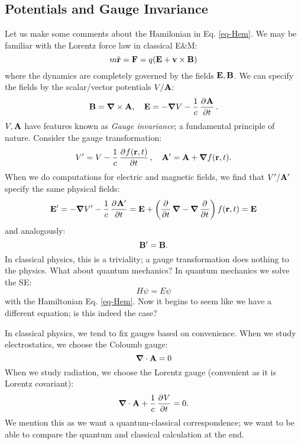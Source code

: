 \subsection{Potentials and Gauge Invariance}
Let us make some comments about the Hamilonian in Eq. \eqref{eq-Hem}. We may be familiar with the Lorentz force law in classical E\&M:
\begin{equation}
    m\ddot{\mathbf{r}} = \mathbf{F} = q(\mathbf{E} + \mathbf{v} \times \mathbf{B})
\end{equation}
where the dynamics are completely governed by the fields $\mathbf{E}, \mathbf{B}$. We can specify the fields by the scalar/vector potentials $V/\mathbf{A}$:
\begin{equation}
    \v{B} = \nabla \times \v{A}, \quad \v{E} = -\nabla V - \frac{1}{c}\dpd{\v{A}}{t}.
\end{equation}
$V, \mathbf{A}$ have features known as \emph{Gauge invariance}; a fundamental principle of nature. Consider the gauge transformation:
\begin{equation}
    V' = V - \frac{1}{c}\dpd{f(\v{r}, t)}{t}, \quad \v{A}' = \v{A} + \nabla f(\v{r}, t).
\end{equation}
When we do computations for electric and magnetic fields, we find that $V'/\mathbf{A}'$ specify the same physical fields:
\begin{equation}
    \v{E}' = -\nabla V' - \frac{1}{c}\dpd{\v{A}'}{t} = \v{E} + \left(\dpd{}{t}\nabla  - \nabla \dpd{}{t}\right)f(\v{r}, t) = \v{E}
\end{equation}
and analogously:
\begin{equation}
    \mathbf{B}' = \mathbf{B}.
\end{equation}
In classical physics, this is a triviality; a gauge transformation does nothing to the physics. What about quantum mechanics? In quantum mechanics we solve the SE:
\begin{equation}
    H\psi = E\psi
\end{equation} 
with the Hamiltonian Eq. \eqref{eq-Hem}. Now it begins to seem like we have a different equation; is this indeed the case? 

In classical physics, we tend to fix gauges based on convenience. When we study electrostatics, we choose the Coloumb gauge:
\begin{equation}
    \nabla \cdot \v{A} = 0
\end{equation}
When we study radiation, we choose the Lorentz gauge (convenient as it is Lorentz covariant):
\begin{equation}
    \nabla \cdot \v{A} + \frac{1}{c}\dpd{V}{t} = 0.
\end{equation} 
We mention this as we want a quantum-classical correspondence; we want to be able to compare the quantum and classical calculation at the end.

